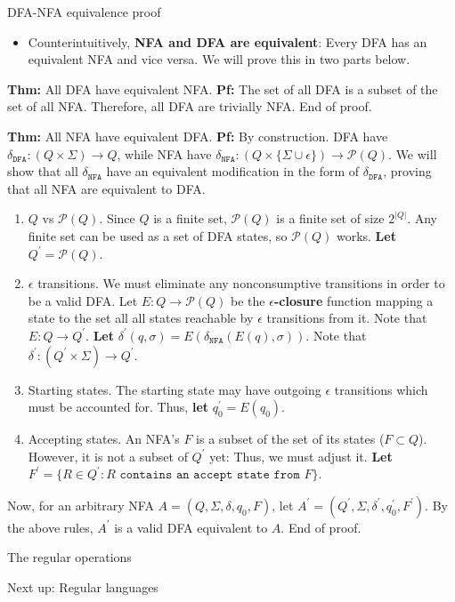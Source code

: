 \begin{frame}{DFA-NFA equivalence proof}
\protect\hypertarget{dfa-nfa-equivalence-proof}{}
\begin{itemize}
\tightlist
\item
  Counterintuitively, \textbf{NFA and DFA are equivalent}: Every DFA has
  an equivalent NFA and vice versa. We will prove this in two parts
  below.
\end{itemize}

\textbf{Thm:} All DFA have equivalent NFA. \textbf{Pf:} The set of all
DFA is a subset of the set of all NFA. Therefore, all DFA are trivially
NFA. End of proof.

\textbf{Thm:} All NFA have equivalent DFA. \textbf{Pf:} By construction.
DFA have \(\delta_\texttt{DFA}: (Q \times \Sigma) \to Q\), while NFA
have
\(\delta_\texttt{NFA}: (Q \times \{ \Sigma \cup \epsilon \}) \to \mathcal{P}(Q)\).
We will show that all \(\delta_\texttt{NFA}\) have an equivalent
modification in the form of \(\delta_\texttt{DFA}\), proving that all
NFA are equivalent to DFA.

\begin{enumerate}
[1)]
\item
  \(Q\) vs \(\mathcal{P}(Q)\). Since \(Q\) is a finite set,
  \(\mathcal{P}(Q)\) is a finite set of size \(2^{|Q|}\). Any finite set
  can be used as a set of DFA states, so \(\mathcal{P}(Q)\) works.
  \textbf{Let} \(Q^\prime = \mathcal{P}(Q)\).
\item
  \(\epsilon\) transitions. We must eliminate any nonconsumptive
  transitions in order to be a valid DFA. Let
  \(E: Q \to \mathcal{P}(Q)\) be the \textbf{\(\epsilon\)-closure}
  function mapping a state to the set all all states reachable by
  \(\epsilon\) transitions from it. Note that \(E: Q \to Q^\prime\).
  \textbf{Let}
  \(\delta^\prime(q, \sigma) = E(\delta_\texttt{NFA}(E(q), \sigma))\).
  Note that \(\delta^\prime : (Q^\prime \times \Sigma) \to Q^\prime\).
\item
  Starting states. The starting state may have outgoing \(\epsilon\)
  transitions which must be accounted for. Thus, \textbf{let}
  \(q_0^\prime = E(q_0)\).
\item
  Accepting states. An NFA's \(F\) is a subset of the set of its states
  (\(F \subset Q\)). However, it is not a subset of \(Q^\prime\) yet:
  Thus, we must adjust it. \textbf{Let}
  \(F^\prime = \{ R \in Q^\prime : R \texttt{ contains an accept state from } F \}\).
\end{enumerate}

Now, for an arbitrary NFA \(A = (Q, \Sigma, \delta, q_0, F)\), let
\(A^\prime = (Q^\prime, \Sigma, \delta^\prime, q_0^\prime, F^\prime)\).
By the above rules, \(A^\prime\) is a valid DFA equivalent to \(A\). End
of proof.
\end{frame}

\begin{frame}{The regular operations}
\protect\hypertarget{the-regular-operations}{}
\end{frame}

\begin{frame}{Next up: Regular languages}
\protect\hypertarget{next-up-regular-languages}{}
\end{frame}
